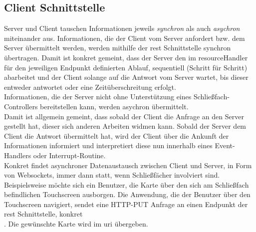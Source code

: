 \subsection{Client Schnittstelle}
Server und Client tauschen Informationen jeweils \textit{synchron} als auch \textit{asychron} miteinander aus. Informationen, die der Client vom Server anfordert bzw. dem Server übermittelt werden, werden mithilfe der \acrshort{rest} Schnittstelle synchron übertragen. Damit ist konkret gemeint, dass der Server den im \gls{resourceHandler} für den jeweiligen Endpunkt definierten Ablauf, sequentiell (Schritt für Schritt) abarbeitet und der Client solange auf die Antwort vom Server wartet, bis dieser entweder antwortet oder eine Zeitüberschreitung erfolgt.\\
Informationen, die der Server nicht ohne Unterstützung eines Schließfach-Controllers bereitstellen kann, werden asychron übermittelt.\\
Damit ist allgemein gemeint, dass sobald der Client die Anfrage an den Server gestellt hat, dieser sich anderen Arbeiten widmen kann. Sobald der Server dem Client die Antwort übermittelt hat, wird der Client über die Ankunft der Informationen informiert und interpretiert diese nun innerhalb eines Event-Handlers oder Interrupt-Routine.\\
Konkret findet asynchroner Datenaustausch zwischen Client und Server, in Form von Websockets, immer dann statt, wenn Schließfächer involviert sind. Beispielsweise möchte sich ein Benutzer, die Karte   über den sich am Schließfach befindlichen Touchscreen ausborgen. Die Anwendung, die der Benutzer über den Touchscreen navigiert, sendet eine HTTP-PUT Anfrage an einen Endpunkt der \acrshort{rest} Schnittstelle, konkret\\ \frqq{}\flqq{}.  Die gewünschte Karte wird im \acrshort{uri} übergeben.\bigskip

